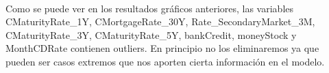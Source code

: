 \documentclass[11pt]{article}
\begin{document}
    
    
    \begin{center}
    \end{center}
    { \hspace*{\fill} \\}
    
    
    
    \begin{center}
    \end{center}
    { \hspace*{\fill} \\}
    
    
    
    \begin{center}
    \end{center}
    { \hspace*{\fill} \\}
    
    
    
    \begin{center}
    \end{center}
    { \hspace*{\fill} \\}
    
    
    
    \begin{center}
    \end{center}
    { \hspace*{\fill} \\}
    
    \begin{center}
    \end{center}
    { \hspace*{\fill} \\}
    
    Como se puede ver en los resultados gráficos anteriores, las variables
CMaturityRate\_1Y, CMortgageRate\_30Y, Rate\_SecondaryMarket\_3M,
CMaturityRate\_3Y, CMaturityRate\_5Y, bankCredit, moneyStock y
MonthCDRate contienen outliers. En principio no los eliminaremos ya que
pueden ser casos extremos que nos aporten cierta información en el
modelo.
\end{document}
